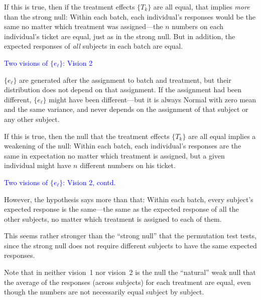 \documentclass[landscape]{slides}
\begin{document}
\begin{slide}
\begin{slide}
If this is true, then if the treatment effects $\{T_k\}$ are all equal, that
implies {\em more\/} than the strong null: Within each batch,
each individual's responses would be the same
no matter which treatment was assigned---the $n$ numbers on
each individual's ticket are equal, just as in the strong null.
But in addition, the expected responses of {\em all\/} 
subjects in each batch are equal.

\end{slide}

\begin{slide}
{\textcolor{blue}{Two visions of $\{e_\ell\}$: Vision 2}}

$\{e_\ell\}$ are generated after the assignment to batch and treatment,
but their distribution does not depend on that assignment.
If the assignment had been different,  $\{e_\ell\}$ might have been different---but
it is always Normal with zero mean and the same variance, and never 
depends on the assignment of that subject or any other subject.

If this is true, then the null that the treatment effects $\{T_k\}$ are all equal
implies a weakening of the null: Within each batch,
each individual's responses are the same in expectation
no matter which treatment is assigned,
but a given individual might have $n$ different numbers on his ticket.

\end{slide}

\begin{slide}
{\textcolor{blue}{Two visions of $\{e_\ell\}$: Vision 2, contd.}}

However, the hypothesis says more than that: Within each batch, 
every subject's expected response is the same---the same
as the expected response of all the other subjects, no 
matter which treatment is assigned to each of them.

This seems rather stronger than the ``strong null'' that the permutation test tests,
since the strong null does not require different subjects to have
the same expected responses.

Note that in neither vision~1 nor vision~2 is the null the ``natural'' weak null that
the average of the responses (across subjects) for each treatment are equal, even
though the numbers are not necessarily equal subject by subject.


\end{slide}
\end{slide}
\end{document}
